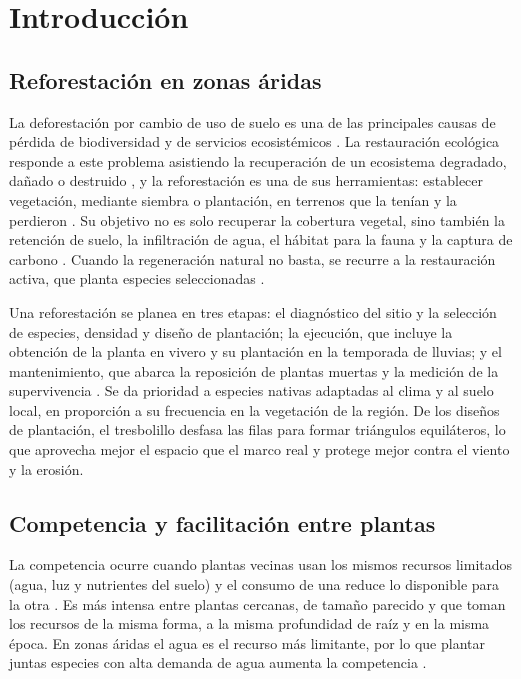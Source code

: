 \section{Introducción}
\label{sec:introduccion}

\subsection{Reforestación en zonas áridas}
\label{subsec:reforestacion}

La deforestación por cambio de uso de suelo es una de las principales causas de pérdida de biodiversidad y de servicios ecosistémicos \autocite{geist2002}. La restauración ecológica responde a este problema asistiendo la recuperación de un ecosistema degradado, dañado o destruido \autocite{ser2004}, y la reforestación es una de sus herramientas: establecer vegetación, mediante siembra o plantación, en terrenos que la tenían y la perdieron \autocite{conafor2010}. Su objetivo no es solo recuperar la cobertura vegetal, sino también la retención de suelo, la infiltración de agua, el hábitat para la fauna y la captura de carbono \autocite{chazdon2008}. Cuando la regeneración natural no basta, se recurre a la restauración activa, que planta especies seleccionadas \autocite{holl2011}.

Una reforestación se planea en tres etapas: el diagnóstico del sitio y la selección de especies, densidad y diseño de plantación; la ejecución, que incluye la obtención de la planta en vivero y su plantación en la temporada de lluvias; y el mantenimiento, que abarca la reposición de plantas muertas y la medición de la supervivencia \autocite{conafor2010}. Se da prioridad a especies nativas adaptadas al clima y al suelo local, en proporción a su frecuencia en la vegetación de la región. De los diseños de plantación, el tresbolillo desfasa las filas para formar triángulos equiláteros, lo que aprovecha mejor el espacio que el marco real y protege mejor contra el viento y la erosión.

\subsection{Competencia y facilitación entre plantas}
\label{subsec:competencia}

La competencia ocurre cuando plantas vecinas usan los mismos recursos limitados (agua, luz y nutrientes del suelo) y el consumo de una reduce lo disponible para la otra \autocite{craine2013}. Es más intensa entre plantas cercanas, de tamaño parecido y que toman los recursos de la misma forma, a la misma profundidad de raíz y en la misma época. En zonas áridas el agua es el recurso más limitante, por lo que plantar juntas especies con alta demanda de agua aumenta la competencia \autocite{padilla2006}.

